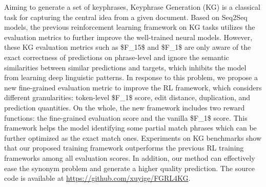 Aiming to generate a set of keyphrases, Keyphrase Generation (KG) is a classical task for capturing the central idea from a given document. Based on Seq2Seq models, the previous reinforcement learning framework on KG tasks utilizes the evaluation metrics to further improve the well-trained neural models. However, these KG evaluation metrics such as \$F\_1\@5\$ and \$F\_1\@M\$ are only aware of the exact correctness of predictions on phrase-level and ignore the semantic similarities between similar predictions and targets, which inhibits the model from learning deep linguistic patterns. In response to this problem, we propose a new fine-grained evaluation metric to improve the RL framework, which considers different granularities: token-level \$F\_1\$ score, edit distance, duplication, and prediction quantities. On the whole, the new framework includes two reward functions: the fine-grained evaluation score and the vanilla \$F\_1\$ score. This framework helps the model identifying some partial match phrases which can be further optimized as the exact match ones. Experiments on KG benchmarks show that our proposed training framework outperforms the previous RL training frameworks among all evaluation scores. In addition, our method can effectively ease the synonym problem and generate a higher quality prediction. The source code is available at \url{https://github.com/xuyige/FGRL4KG}.
